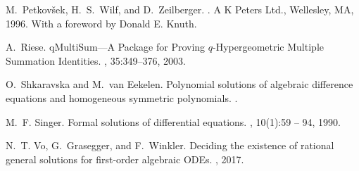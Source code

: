 \documentclass[10pt,a4paper]{article}
\begin{document}
\begin{thebibliography}{10}

M.~Petkov{\v{s}}ek, H.~S.~Wilf, and D.~Zeilberger.
.
\newblock A K Peters Ltd., Wellesley, MA, 1996.
\newblock With a foreword by Donald E. Knuth.

A.~Riese.
\newblock qMultiSum---A Package for Proving $q$-Hypergeometric Multiple Summation Identities.
, 35:349--376, 2003.


O.~Shkaravska and M.~van Eekelen.
\newblock Polynomial solutions of algebraic difference equations and
  homogeneous symmetric polynomials.
.

M.~F. Singer.
\newblock Formal solutions of differential equations.
, 10(1):59 -- 94, 1990.




N.~T. Vo, G.~Grasegger, and F.~Winkler.
\newblock Deciding the existence of rational general solutions for first-order
  algebraic {ODEs}.
, 2017.


\end{thebibliography}
\end{document}

